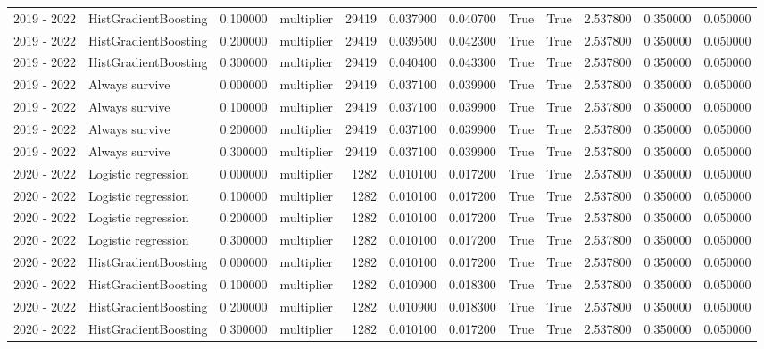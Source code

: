 \begin{tabular}{llrlrrrrrrrr}
2019 - 2022 & HistGradientBoosting & 0.100000 & multiplier & 29419 & 0.037900 & 0.040700 & True & True & 2.537800 & 0.350000 & 0.050000 \\
2019 - 2022 & HistGradientBoosting & 0.200000 & multiplier & 29419 & 0.039500 & 0.042300 & True & True & 2.537800 & 0.350000 & 0.050000 \\
2019 - 2022 & HistGradientBoosting & 0.300000 & multiplier & 29419 & 0.040400 & 0.043300 & True & True & 2.537800 & 0.350000 & 0.050000 \\
2019 - 2022 & Always survive & 0.000000 & multiplier & 29419 & 0.037100 & 0.039900 & True & True & 2.537800 & 0.350000 & 0.050000 \\
2019 - 2022 & Always survive & 0.100000 & multiplier & 29419 & 0.037100 & 0.039900 & True & True & 2.537800 & 0.350000 & 0.050000 \\
2019 - 2022 & Always survive & 0.200000 & multiplier & 29419 & 0.037100 & 0.039900 & True & True & 2.537800 & 0.350000 & 0.050000 \\
2019 - 2022 & Always survive & 0.300000 & multiplier & 29419 & 0.037100 & 0.039900 & True & True & 2.537800 & 0.350000 & 0.050000 \\
2020 - 2022 & Logistic regression & 0.000000 & multiplier & 1282 & 0.010100 & 0.017200 & True & True & 2.537800 & 0.350000 & 0.050000 \\
2020 - 2022 & Logistic regression & 0.100000 & multiplier & 1282 & 0.010100 & 0.017200 & True & True & 2.537800 & 0.350000 & 0.050000 \\
2020 - 2022 & Logistic regression & 0.200000 & multiplier & 1282 & 0.010100 & 0.017200 & True & True & 2.537800 & 0.350000 & 0.050000 \\
2020 - 2022 & Logistic regression & 0.300000 & multiplier & 1282 & 0.010100 & 0.017200 & True & True & 2.537800 & 0.350000 & 0.050000 \\
2020 - 2022 & HistGradientBoosting & 0.000000 & multiplier & 1282 & 0.010100 & 0.017200 & True & True & 2.537800 & 0.350000 & 0.050000 \\
2020 - 2022 & HistGradientBoosting & 0.100000 & multiplier & 1282 & 0.010900 & 0.018300 & True & True & 2.537800 & 0.350000 & 0.050000 \\
2020 - 2022 & HistGradientBoosting & 0.200000 & multiplier & 1282 & 0.010900 & 0.018300 & True & True & 2.537800 & 0.350000 & 0.050000 \\
2020 - 2022 & HistGradientBoosting & 0.300000 & multiplier & 1282 & 0.010100 & 0.017200 & True & True & 2.537800 & 0.350000 & 0.050000 \\

\end{tabular}
